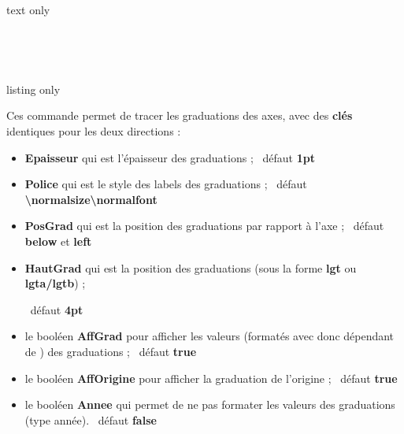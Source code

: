\documentclass[a4paper,french,11pt]{article}
\newcommand\ctex[1]{\tcbox[vignettelatex]{#1}}
\newcommand\Cle[1]{{\bfseries\sffamily\textlangle \textcolor{orange!75!black}{#1}\textrangle}}
\begin{document}
\begin{PresCodeSortiePL}{text only}
\hfill~
\begin{tikzpicture}%
	[x=0.3cm,y=0.06cm,%
	Ox=1992,xmin=1992,xmax=2012,xgrille=2,xgrilles=1,%
	Oy=1640,ymin=1640,ymax=1730,ygrille=10,ygrilles=5]
	\AxesTikz
\end{tikzpicture}
~~
\begin{tikzpicture}%
	[x=0.3cm,y=0.06cm,%
	Ox=1992,xmin=1992,xmax=2012,xgrille=2,xgrilles=1,%
	Oy=1640,ymin=1640,ymax=1730,ygrille=10,ygrilles=5]
	\AxesTikz%
		[AffLabel=xy,Labelx={Année},Labely={Altitude},%
		PosLabelx={below right},PosLabely={above left},%
		Police=\small\sffamily]
\end{tikzpicture}
\hfill~
\end{PresCodeSortiePL}


\begin{PresCodeTexPL}{listing only}
\end{PresCodeTexPL}

\begin{cautionblock}
Ces commande permet de tracer les graduations des axes, avec des \Cle{clés} identiques pour les deux directions :

\begin{itemize}
	\item \Cle{Epaisseur} qui est l'épaisseur des graduations ; \hfill~défaut \Cle{1pt}
	\item \Cle{Police} qui est le style des labels des graduations ; \hfill~défaut \Cle{\textbackslash{}normalsize\textbackslash{}normalfont}
	\item \Cle{PosGrad} qui est la position des graduations par rapport à l'axe ; \hfill~défaut \Cle{below} et \Cle{left}
	\item \Cle{HautGrad} qui est la position des graduations (sous la forme \Cle{lgt} ou \Cle{lgta/lgtb}) ;
	
	\hfill~défaut \Cle{4pt}
	\item le booléen \Cle{AffGrad} pour afficher les valeurs (formatés avec \ctex{num} donc dépendant de \ctex{sisetup}) des graduations  ; \hfill~défaut \Cle{true}
	\item le booléen \Cle{AffOrigine} pour afficher la graduation de l'origine ; \hfill~défaut \Cle{true}
	\item le booléen \Cle{Annee} qui permet de ne pas formater les valeurs des graduations (type \textsf{année}). \hfill~défaut \Cle{false}
\end{itemize}
\vspace*{-\baselineskip}\leavevmode
\end{cautionblock}
\end{document}
